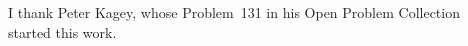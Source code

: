 \documentclass[EJP,preprint]{ejpecp}
\theoremstyle{ejpecpbodyit}
\begin{document}










\appendix




\begin{acks}[Acknowledgments]
I thank Peter Kagey, whose Problem~131 in his Open Problem
Collection~\cite{kagey131} started this work.
\end{acks}
\end{document}
